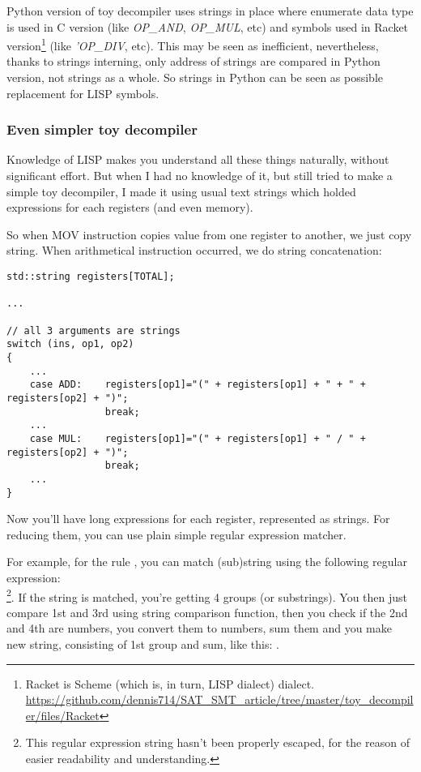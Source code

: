 Python version of toy decompiler uses strings in place where enumerate data type is used in C version
(like \textit{OP\_AND}, \textit{OP\_MUL}, etc) and
symbols used in Racket version\footnote{Racket is Scheme (which is, in turn, LISP dialect) dialect.
\url{https://github.com/dennis714/SAT_SMT_article/tree/master/toy_decompiler/files/Racket}} (like \textit{'OP\_DIV}, etc).
This may be seen as inefficient, nevertheless, thanks to strings interning, only address of strings are compared in
Python version, not strings as a whole. So strings in Python can be seen as possible replacement for LISP symbols.

\subsubsection{Even simpler toy decompiler}

Knowledge of LISP makes you understand all these things naturally, without significant effort.
But when I had no knowledge of it, but still tried to make a simple toy decompiler, I made it using usual text strings
which holded expressions for each registers (and even memory).

So when MOV instruction copies value from one register to another, we just copy string.
When arithmetical instruction occurred, we do string concatenation:

\begin{lstlisting}
std::string registers[TOTAL];

...

// all 3 arguments are strings
switch (ins, op1, op2)
{
    ...
    case ADD:    registers[op1]="(" + registers[op1] + " + " + registers[op2] + ")";
                 break;
    ...
    case MUL:    registers[op1]="(" + registers[op1] + " / " + registers[op2] + ")";
                 break;
    ...
}
\end{lstlisting}

Now you'll have long expressions for each register, represented as strings.
For reducing them, you can use plain simple regular expression matcher.

For example, for the rule , you can match (sub)string using the following
regular expression: \\
\footnote{This regular expression string hasn't been properly escaped,
for the reason of easier readability and understanding.}.
If the string is matched, you're getting 4 groups (or substrings).
You then just compare 1st and 3rd using string comparison function, then you check if
the 2nd and 4th are numbers, you convert them to numbers, sum them and you make new string, consisting
of 1st group and sum, like this: .

